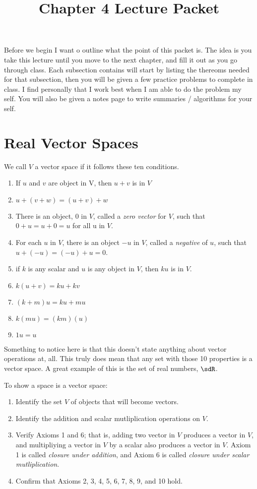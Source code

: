 \documentclass{report}
\title{Chapter 4 Lecture Packet}
\begin{document}
\maketitle
\pagebreak

Before we begin I want o outline what the point of this packet is. The idea is you take this lecture until you move to the next chapter, and fill it out as you go through class. Each subsection contains will start by listing the thereoms needed for that subsection, then you will be given a few practice problems to complete in class. I find personally that I work best when I am able to do the problem my self. You will also be given a notes page to write summaries / algorithms for your self.

\pagebreak

\section{Real Vector Spaces}

\bdefn
We call $V$ a vector space if it follows these ten conditions.

\begin{enumerate}
    \item If $u$ and $v$ are object in V, then $u + v$ is in $V$ 
    \item $u + (v + w) = (u+v)+w$ 
    \item There is an object, $0$ in $V$, called a \textit{zero vector} for $V$, such that $0+u=u+0=u$ for all u in $V$.
    \item For each $u$ in $V$, there is an object $-u$ in $V$, called a \textit{negative} of $u$, such that $u + (-u)=(-u)+u=0$. 
    \item if $k$ is any scalar and $u$ is any object in $V$, then $ku$ is in $V$. 
    \item $k(u+v)=ku+kv$ 
    \item $(k + m)u = ku + mu$
    \item $k(mu)=(km)(u)$ 
    \item $1u = u$
\end{enumerate}


\brmku
Something to notice here is that this doesn't state anything about vector operations at, all. This truly does mean that any set with those 10 properties is a vector space. A great example of this is the set of real numbers, $\sdR$.
\ermku

To show a space is a vector space:

\begin{enumerate}
    \item Identify the set $V$ of objects that will become vectors. 
    \item Identify the addition and scalar mutliplication operations on $V$. 
    \item Verify Axioms 1 and 6; that is, adding two vector in $V$ produces a vector in $V$, and multipliying a vector in $V$ by a scalar also produces a vector in $V$. Axiom 1 is called \textit{closure under addition}, and Axiom 6 is called \textit{closure under scalar mutliplication}. 
    \item Confirm that Axioms 2, 3, 4, 5, 6, 7, 8, 9, and 10 hold.
\end{enumerate}
\end{document}
